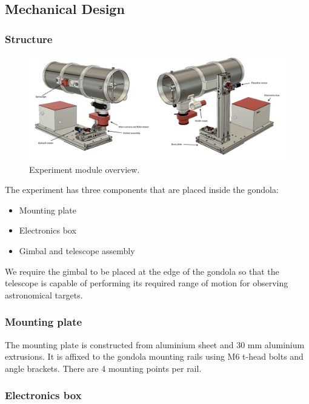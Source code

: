 \newpage
\subsection{Mechanical Design} \label{Mechanical_Design}
\label{sec:mechanical-design}

\subsubsection{Structure}

\begin{figure}[H]
	\centering 
	\includegraphics[scale=0.4]{4-experiment-design/img/mechanical/iso1.png}
	\caption{Experiment module overview.}
	\label{fig::mechanical::iso1}
\end{figure}

\label{sec:4.4.1}
The experiment has three components that are placed inside the gondola:
\begin{itemize}
  \item Mounting plate    
  \item Electronics box
  \item Gimbal and telescope assembly
\end{itemize}

We require the gimbal to be placed at the edge of the gondola so that the telescope is capable of performing its required range of motion for observing astronomical targets.



\subsubsection{Mounting plate}

The mounting plate is constructed from aluminium sheet and 30 mm aluminium extrusions. It is affixed to the gondola mounting rails using M6 t-head bolts and angle brackets. There are 4 mounting points per rail. 

\subsubsection{Electronics box}
\label{sec:4.4.2}

